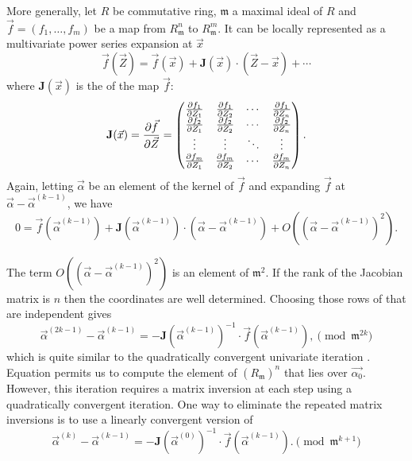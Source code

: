 {More generally, let $R$ be commutative ring, $\mathfrak{m}$ a maximal
ideal of $R$ and $\vec{f} = (f_1,\ldots,f_m)$ be a map from $R_\mathfrak{
m}^n$ to $R_\mathfrak{m}^m$.  It can be locally represented as a
multivariate power series expansion at $\vec{x}$
\[
\vec{f} (\vec{Z}) = \vec{f}(\vec{x}) 
  + \mathbf{J}(\vec{x})\cdot(\vec{Z} - \vec{x}) 
  + \cdots
\]
where $\mathbf{J}(\vec{x})$ is the  of the map $\vec{f}$:
\[
\mathbf{J}(\vec{x}) = 
\frac{\partial \vec{f}}{\partial \vec{Z}}
=
\begin{pmatrix}{\partial f_1\over \partial Z_1}& {\partial f_1\over \partial Z_2}&
 \cdots&{\partial f_1\over \partial Z_n}\\
{\partial f_2\over \partial Z_1}& {\partial f_2\over \partial Z_2}&
 \cdots&{\partial f_2\over \partial Z_n}\\
\vdots&\vdots&\ddots&\vdots\\
{\partial f_m\over \partial Z_1}& {\partial f_m\over \partial Z_2}&
 \cdots&{\partial f_m\over \partial Z_n}\end{pmatrix}.
\]
Again, letting $\vec{\alpha}$ be an element of the kernel of $\vec{f}$ and
expanding $\vec{f}$ at $\vec{\alpha} - \vec{\alpha}^{(k-1)}$, we have
\begin{equation}
0 = \vec{f}(\vec{\alpha}^{(k-1)}) + \mathbf{J}(\vec{\alpha}^{(k-1)}) 
\cdot (\vec{\alpha}  - \vec{\alpha}^{(k-1)}) +
O\left((\vec{\alpha} - \vec{\alpha}^{(k-1)})^{2}\right).
\label{MNewton:1:Eq}
\end{equation}

The term $O\left((\vec{\alpha} - \vec{\alpha}^{(k-1)})^{2}\right)$ is an
element of $\mathfrak{m}^{2}$.  If the rank of the Jacobian matrix is $n$
then the coordinates are well determined.  Choosing those rows of
 that are independent gives
\begin{equation}\label{MNewton:2:Eq}
\vec{\alpha}^{(2k-1)} - \vec{\alpha}^{(k-1)} 
  = -\mathbf{J}(\vec{\alpha}^{(k-1)})^{-1} 
  \cdot \vec{f}(\vec{\alpha}^{(k-1)}), \pmod{\mathfrak{m}^{2k}}
\end{equation}
which is quite similar to the quadratically convergent univariate iteration
.  Equation  permits us to 
compute the element of 
$(R_\mathfrak{m})^n$ that lies over $\vec{\alpha_0}$.  However, this iteration
requires a matrix inversion at each step using a quadratically convergent 
iteration.  One way to eliminate the repeated matrix inversions is to use 
a linearly convergent version of 
\begin{equation}\label{MNewton:Lin:Eq}
\vec{\alpha}^{(k)} - \vec{\alpha}^{(k-1)}
   = -\mathbf{J}(\vec{\alpha}^{(0)})^{-1} 
  \cdot \vec{f}(\vec{\alpha}^{(k-1)}). \pmod{\mathfrak{m}^{k+1}}
\end{equation}

}
